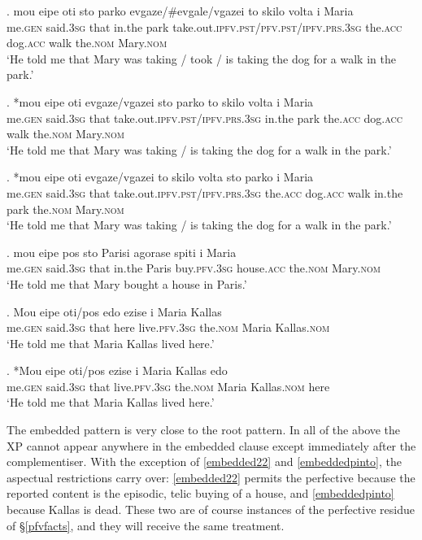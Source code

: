 \documentclass[11pt]{article}
\newcommand{\pfv}{\textsc{pfv}\xspace}
\newcommand{\ipfv}{\textsc{ipfv}\xspace}
\begin{document}
\exg. mou eipe oti sto parko evgaze/\#evgale/vgazei to skilo volta i Maria\\
me.\textsc{gen} said.3\textsc{sg} that in.the park take.out.\ipfv.\textsc{pst}/\pfv.\textsc{pst}/\ipfv.\textsc{prs}.3\textsc{sg} the.\textsc{acc} dog.\textsc{acc} walk the.\textsc{nom} Mary.\textsc{nom}\\ \label{embedded1}
`He told me that Mary was taking / took / is taking the dog for a walk in the park.'

\exg. *mou eipe oti evgaze/vgazei sto parko to skilo volta i Maria\\
me.\textsc{gen} said.3\textsc{sg} that take.out.\ipfv.\textsc{pst}/\ipfv.\textsc{prs}.3\textsc{sg} in.the park the.\textsc{acc} dog.\textsc{acc} walk the.\textsc{nom} Mary.\textsc{nom}\\ \label{embedded11}
`He told me that Mary was taking / is taking the dog for a walk in the park.'

\exg. *mou eipe oti evgaze/vgazei to skilo volta sto parko i Maria\\
me.\textsc{gen} said.3\textsc{sg} that take.out.\ipfv.\textsc{pst}/\ipfv.\textsc{prs}.3\textsc{sg} the.\textsc{acc} dog.\textsc{acc} walk in.the park the.\textsc{nom} Mary.\textsc{nom}\\ \label{embedded12}
`He told me that Mary was taking / is taking the dog for a walk in the park.'

\exg. mou eipe pos sto Parisi agorase spiti i Maria\\
me.\textsc{gen} said.3\textsc{sg} that in.the Paris buy.\pfv.3\textsc{sg} house.\textsc{acc} the.\textsc{nom} Mary.\textsc{nom}\\ \label{embedded22}
`He told me that Mary bought a house in Paris.'

\exg. Mou eipe oti/pos edo ezise i Maria Kallas\\
me.\textsc{gen} said.3\textsc{sg} that here live.\pfv.3\textsc{sg} the.\textsc{nom} Maria Kallas.\textsc{nom}\\ \label{embeddedpinto}
`He told me that Maria Kallas lived here.'

\exg. *Mou eipe oti/pos ezise i Maria Kallas edo\\
me.\textsc{gen} said.3\textsc{sg} that live.\pfv.3\textsc{sg} the.\textsc{nom} Maria Kallas.\textsc{nom} here\\ \label{embeddedpinto2}
`He told me that Maria Kallas lived here.'

The embedded pattern is very close to the root pattern.  In all of the above the XP cannot appear anywhere in the embedded clause except immediately after the complementiser.  With the exception of \ref{embedded22} and \ref{embeddedpinto}, the aspectual restrictions carry over: \ref{embedded22} permits the perfective because the reported content is the episodic, telic buying of a house, and \ref{embeddedpinto} because Kallas is dead.  These two are of course instances of the perfective residue of \S\ref{pfvfacts}, and they will receive the same treatment.
\end{document}
